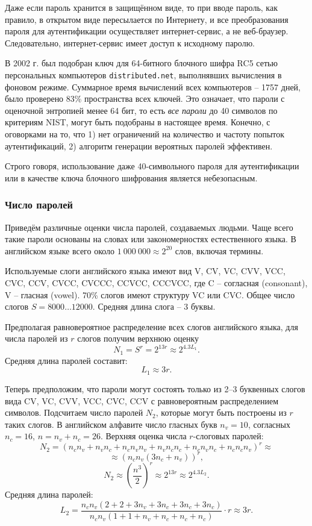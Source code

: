 Даже если пароль хранится в защищённом виде, то при вводе пароль, как правило, в открытом виде пересылается по Интернету, и все преобразования пароля для аутентификации осуществляет интернет-сервис, а не веб-браузер. Следовательно, интернет-сервис имеет доступ к исходному паролю.
\exampleend

В 2002 г. был подобран ключ для 64-битного блочного шифра RC5 сетью персональных компьютеров \texttt{distributed.net}, выполнявших вычисления в фоновом режиме. Суммарное время вычислений всех компьютеров -- 1757 дней, было проверено 83\% пространства всех ключей. Это означает, что пароли с оценочной энтропией менее 64 бит, то есть \emph{все пароли} до 40 символов по критериям NIST, могут быть подобраны в настоящее время. Конечно, с оговорками на то, что 1) нет ограничений на количество и частоту попыток аутентификаций, 2) алгоритм генерации вероятных паролей эффективен.

Строго говоря, использование даже 40-символьного пароля для аутентификации или в качестве ключа блочного шифрования является небезопасным.


\subsubsection{Число паролей}

Приведём различные оценки числа паролей, создаваемых людьми. Чаще всего такие пароли основаны на словах или закономерностях естественного языка. В английском языке всего около $1\ 000\ 000 \approx 2^{20}$ слов, включая термины.


Используемые слоги английского языка имеют вид V, CV, VC, CVV, VCC, CVC, CCV, CVCC, CVCCC, CCVCC, CCCVCC, где C -- согласная (consonant), V -- гласная (vowel). 70\% слогов имеют структуру VC или CVC. Общее число слогов $S = 8000 \dots 12000$. Средняя длина слога -- 3 буквы.

Предполагая равновероятное распределение всех слогов английского языка, для числа паролей из $r$ слогов получим верхнюю оценку
    \[ N_1 = S^r = 2^{13 r} \approx 2^{4.3 L_1}. \]
Средняя длина паролей составит:
    \[ L_1 \approx 3 r. \]

Теперь предположим, что пароли могут состоять только из 2--3 буквенных слогов вида CV, VC, CVV, VCC, CVC, CCV с равновероятным распределением символов. Подсчитаем число паролей $N_2$, которые могут быть построены из $r$ таких слогов. В английском алфавите число гласных букв $n_v = 10$, согласных $n_c = 16$, $n = n_v + n_c = 26$. Верхняя оценка числа $r$-слоговых паролей:
    \[ N_2 = (n_c n_v + n_v n_c + n_c n_v n_v + n_v n_c n_c + n_c n_v n_c + n_c n_c n_v)^r \approx \]
        \[ \approx \left( n_c n_v(3 n_c + n_v) \right)^r, \]
    \[ N_2 \approx \left( \frac{n^3}{2} \right)^r \approx 2^{13 r} \approx 2^{4.3 L_2}. \]
Средняя длина паролей:
    \[ L_2 = \frac{n_c n_v(2 + 2 + 3 n_v + 3 n_c + 3 n_c + 3 n_c)}{n_c n_v (1 + 1 + n_v + n_c + n_c + n_c)} \cdot r \approx 3 r. \]

